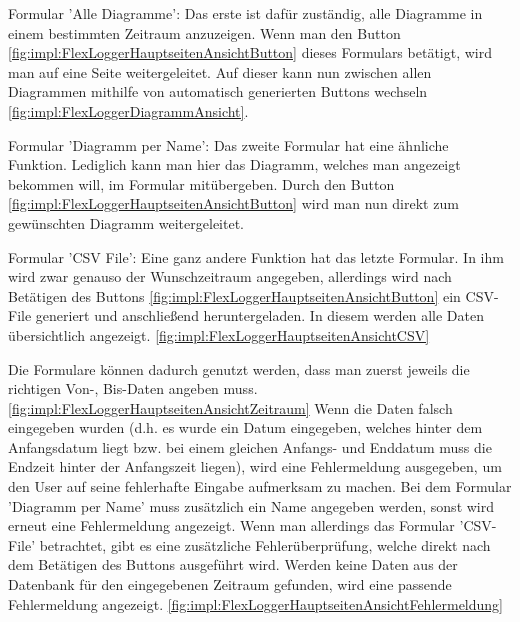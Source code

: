 \begin{compactitem}
    \item Formular 'Alle Diagramme': Das erste ist dafür zuständig, alle Diagramme in einem bestimmten Zeitraum anzuzeigen. Wenn man den Button \ref{fig:impl:FlexLoggerHauptseitenAnsichtButton} dieses Formulars betätigt, wird man auf eine Seite weitergeleitet. Auf dieser kann nun zwischen allen Diagrammen mithilfe von automatisch generierten Buttons wechseln \ref{fig:impl:FlexLoggerDiagrammAnsicht}.
    \item Formular 'Diagramm per Name': Das zweite Formular hat eine ähnliche Funktion. Lediglich kann man hier das Diagramm, welches man angezeigt bekommen will, im Formular mitübergeben. Durch den Button \ref{fig:impl:FlexLoggerHauptseitenAnsichtButton} wird man nun direkt zum gewünschten Diagramm weitergeleitet.
    \item Formular 'CSV File': Eine ganz andere Funktion hat das letzte Formular. In ihm wird zwar genauso der Wunschzeitraum angegeben, allerdings wird nach Betätigen des Buttons \ref{fig:impl:FlexLoggerHauptseitenAnsichtButton} ein CSV-File generiert und anschließend heruntergeladen. In diesem werden alle Daten übersichtlich angezeigt. \ref{fig:impl:FlexLoggerHauptseitenAnsichtCSV}
\end{compactitem}
 
Die Formulare können dadurch genutzt werden, dass man zuerst jeweils die richtigen Von-, Bis-Daten angeben muss. \ref{fig:impl:FlexLoggerHauptseitenAnsichtZeitraum} Wenn die Daten falsch eingegeben wurden (d.h. es wurde ein Datum eingegeben, welches hinter dem Anfangsdatum liegt bzw. bei einem gleichen Anfangs- und Enddatum muss die Endzeit hinter der Anfangszeit liegen), wird eine Fehlermeldung ausgegeben, um den User auf seine fehlerhafte Eingabe aufmerksam zu machen. Bei dem Formular 'Diagramm per Name' muss zusätzlich ein Name angegeben werden, sonst wird erneut eine Fehlermeldung angezeigt. Wenn man allerdings das Formular 'CSV-File' betrachtet, gibt es eine zusätzliche Fehlerüberprüfung, welche direkt nach dem Betätigen des Buttons ausgeführt wird. Werden keine Daten aus der Datenbank für den eingegebenen Zeitraum gefunden, wird eine passende Fehlermeldung angezeigt. \ref{fig:impl:FlexLoggerHauptseitenAnsichtFehlermeldung}
 
